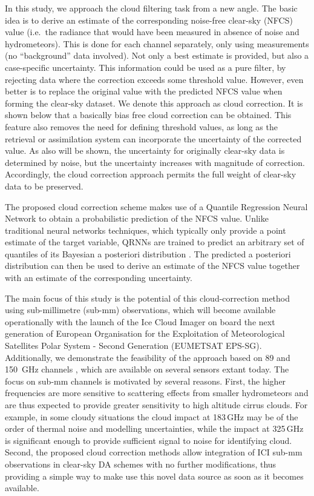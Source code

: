 \documentclass[amt, manuscript]{copernicus}
\begin{document}
In this study, we approach the cloud filtering task from a new angle. The basic idea
is to derive an estimate of the corresponding noise-free clear-sky (NFCS) value
(i.e.\ the radiance that would have been measured in absence of noise and
hydrometeors). This is done for each channel separately, only using
measurements (no ``background'' data involved). Not only a best estimate is
provided, but also a case-specific uncertainty. This information could be used as a pure filter, by rejecting data where the correction exceeds some threshold value. However, even
better is to replace the original value with the predicted NFCS value when
forming the clear-sky dataset. We denote this approach as cloud correction. It
is shown below that a basically bias free cloud correction can be obtained.
This feature also removes the need for defining threshold values, as long as the retrieval or
assimilation system can incorporate the uncertainty of the corrected value. As
also will be shown, the uncertainty for originally clear-sky data is determined
by noise, but the uncertainty increases with magnitude of correction.
Accordingly, the cloud correction approach permits the full weight of
clear-sky data to be preserved.

The proposed cloud correction scheme makes use of a Quantile Regression Neural
Network \cite[QRNN,][]{pfreundschuh:aneur:18} to obtain a probabilistic prediction of the NFCS value. Unlike traditional neural networks techniques, which typically only provide a point
estimate of the target variable, QRNNs are trained to predict an arbitrary set
of quantiles of its Bayesian a posteriori distribution
\citep{pfreundschuh:aneur:18}. The predicted a posteriori distribution 
can then be used to derive an estimate of the NFCS value together with an estimate
of the corresponding uncertainty.

The main focus of this study is the potential of this cloud-correction
method using sub-millimetre (sub-mm) observations, which will become available
operationally with the launch of the Ice Cloud Imager \citep[ICI,][]{eriksson:towar:20} on board the next generation of European Organisation for the Exploitation of Meteorological Satellites Polar System - Second Generation (EUMETSAT EPS-SG). Additionally, we demonstrate the feasibility of the approach based on 89 and 150\ GHz channels \citep[following][]{geer2015scatteringindex}, which are available on several sensors extant today. The focus
on sub-mm channels is motivated by several reasons. First, the higher
frequencies are more sensitive to scattering effects from smaller
hydrometeors and are thus expected to provide greater sensitivity to high altitude cirrus clouds. For example, in some cloudy situations the
cloud impact at 183\,GHz may be of the order of thermal noise and modelling uncertainties,
while the impact at 325\,GHz is significant enough to provide sufficient signal to noise for identifying cloud. Second, the proposed
cloud correction methods allow integration of ICI sub-mm observations in
clear-sky DA schemes with no further modifications, thus providing a simple
way to make use this novel data source as soon as it becomes available.
\end{document}
